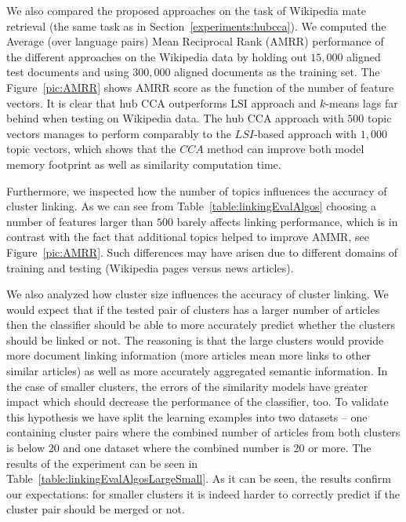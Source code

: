 \documentclass[twoside,11pt]{article}
\begin{document}
We also compared the proposed approaches on the task of Wikipedia mate retrieval (the same task as in Section~\ref{experiments:hubcca}). We computed the Average (over language pairs) Mean Reciprocal Rank (AMRR)   performance of the different approaches on the  Wikipedia data by holding out $15,000$ aligned test documents and using $300,000$ aligned documents as the training set. The Figure~\ref{pic:AMRR} shows AMRR score as the function of the number of feature vectors. It is clear that hub CCA outperforms LSI approach and $k$-means lags far behind when testing on Wikipedia data. The hub CCA approach with $500$ topic vectors manages to perform comparably to the $LSI$-based approach with $1,000$ topic vectors, which shows that the $CCA$ method can improve both model memory footprint as well as similarity computation time.

Furthermore, we inspected how the number of topics influences the accuracy of cluster linking. As we can see from Table~\ref{table:linkingEvalAlgos} choosing a number of features larger than $500$ barely affects linking performance, which is in contrast with the fact that additional topics helped to improve AMMR, see Figure~\ref{pic:AMRR}. Such differences may have arisen due to different domains of training and testing (Wikipedia pages versus news articles).

We also analyzed how cluster size influences the accuracy of cluster linking. We would expect that if the tested pair of clusters has a larger number of articles then the classifier should be able to more accurately predict whether the clusters should be linked or not. The reasoning is that the large clusters would provide more document linking information (more articles mean more links to other similar articles) as well as more accurately aggregated semantic information. In the case of smaller clusters, the errors of the similarity models have greater impact which should decrease the performance of the classifier, too. To validate this hypothesis we have split the learning examples into two datasets -- one containing cluster pairs where the combined number of articles from both clusters is below 20 and one dataset where the combined number is 20 or more. The results of the experiment can be seen in Table~\ref{table:linkingEvalAlgosLargeSmall}. As it can be seen, the results confirm our expectations: for smaller clusters it is indeed harder to correctly predict if the cluster pair should be merged or not.
\end{document}
